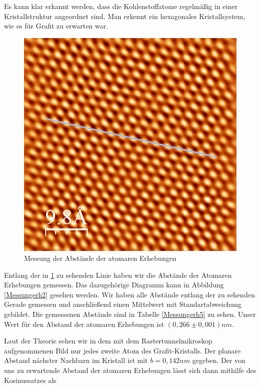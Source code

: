 \documentclass[10pt,a4paper]{article}
\begin{document}
Es kann klar erkannt werden, dass die Kohlenstoffatome regelmäßig in einer Kristallstruktur angeordnet sind. Man erkennt ein hexagonales Kristallsystem, wie es für Grafit zu erwarten war.

\begin{figure}[h]
	\centering

	\includegraphics[scale = 0.6]{Aufnahme_Ebene_doppelte_fourier2.png}

	\caption{Messung der Abstände der atomaren Erhebungen}
	\label{Messungerh1}
\end{figure}

Entlang der in \ref{Messungerh1} zu sehenden Linie haben wir die Abstände der Atomaren Erhebungen gemessen. Das dazugehörige Diagramm kann in Abbildung \ref{Messungerh2} gesehen werden. Wir haben alle Abstände entlang der zu sehenden Gerade gemessen und anschließend einen Mittelwert mit Standartabweichung gebildet. Die gemessenen Abstände sind in Tabelle \ref{Messungerh5} zu sehen. Unser Wert für den Abstand der atomaren Erhebungen ist $(0,266 \pm 0,001) nm$.

Laut der Theorie sehen wir in dem mit dem Rastertunnelmikroskop aufgenommenen Bild nur jedes zweite Atom des Grafit-Kristalls. Der planare Abstand nächster Nachbarn im Kristall ist mit $b = 0,142 nm$ gegeben. Der von uns zu erwartende Abstand der atomaren Erhebungen lässt sich dann mithilfe des Kosinussatzes als 
\end{document}
